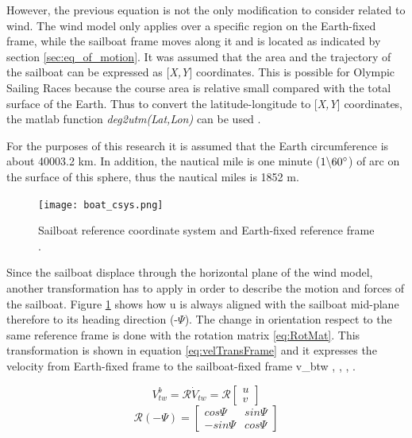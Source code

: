 However, the previous equation is not the only modification to consider related to wind. %
The wind model only applies over a specific region on the Earth-fixed frame, while the sailboat frame moves along it and is located as indicated by section \ref{sec:eq_of_motion}. It was assumed that the area and the trajectory of the sailboat can be expressed as [\textit{X,Y}] coordinates. This is possible for Olympic Sailing Races because the course area is relative small compared with the total surface of the Earth. Thus to convert the latitude-longitude to [\textit{X,Y}] coordinates, the \acrshort{matlab} function \textit{deg2utm(Lat,Lon)} can be used \cite{allsopp1998stochastic}.\par 
\noindent For the purposes of this research it is assumed that the Earth circumference is about 40003.2 km. In addition, the nautical mile is one minute (\textit{$1 \backslash 60 \degree$}) of arc on the surface of this sphere, thus the nautical miles is 1852 m. \par 
\begin{figure}[hbt!]
    \centering
    \texttt{[image: boat\_csys.png]}
    \caption{Sailboat reference coordinate system and Earth-fixed reference frame \cite{keuning2004mathematical}. }
    \label{fig:boat_Csys}
\end{figure}
Since the sailboat displace through the horizontal plane of the wind model, another transformation has to apply in order to describe the motion and forces of the sailboat. Figure \ref{fig:boat_Csys} shows how \acrshort{u} is always aligned with the sailboat mid-plane therefore to its heading direction (-$\Psi$). The change in orientation respect to the same reference frame is done with the rotation matrix \ref{eq:RotMat}. This transformation is shown in equation \ref{eq:velTransFrame} and it expresses the velocity from Earth-fixed frame to the sailboat-fixed frame \acrshort{v_btw} \cite{yang2011control}, \cite{bohm2014velocity}, \cite{Alves2014ASailboat}, \cite{keuning2004mathematical}.\par 
\begin{equation}\label{eq:velTransFrame}
    V_{tw}^b= \mathcal{R} \dot V_{tw}= \mathcal{R}
    \begin{bmatrix}
    u\\
    v
    \end{bmatrix}
\end{equation}
\begin{equation} \label{eq:RotMat}
    \mathcal{R}(- \Psi)=
    \begin{bmatrix}
    cos \Psi & sin\Psi \\
    -sin \Psi & cos \Psi
    \end{bmatrix}
\end{equation}

